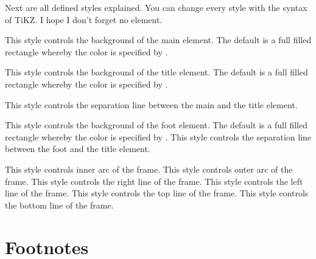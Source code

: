 \documentclass[openany,12pt,tocdepth=3]{ltx-md}
\begin{document}
Next are all defined styles explained. You can change every style with the
syntax of TiKZ.  I hope I don't forget no element.

This style controls the background of the main element. The
default is a full filled rectangle whereby the color
is specified by . 

This style controls the background of the title element. The
default is a full filled rectangle whereby the color
is specified by . 

This style controls the separation line between the main and the title element.

This style controls the background of the foot element. The
default is a full filled rectangle whereby the color
is specified by . 
This style controls the separation line between the foot and the title element.

This style controls inner arc of the frame.
This style controls outer arc of the frame.
This style controls the right line of the frame.
This style controls the left line of the frame.
This style controls the top line of the frame.
This style controls the bottom line of the frame.




\section{Footnotes}\label{sec:footnotes}
\let\nobreak\relax
{}%
\end{document}
